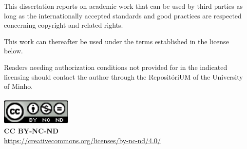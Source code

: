 






\noindent

This dissertation reports on academic work that can be used by third parties as long as the
internationally accepted standards and good practices are respected concerning copyright and related rights.

This work can thereafter be used under the terms established in the license below.

Readers needing authorization conditions not provided for in the indicated licensing should contact the author through the RepositóriUM of the University of Minho.
\paragraph{}


\includegraphics[]{images/CCBYNCND.png}
\\
\textbf{CC BY-NC-ND}
\\
\url{https://creativecommons.org/licenses/by-nc-nd/4.0/}


\setlength{\parskip}{0em}